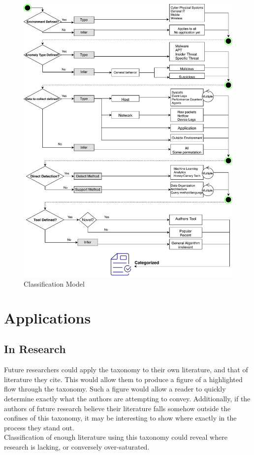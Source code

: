 \documentclass[10pt]{IEEEtran}
\begin{document}
\begin{figure}
  \includegraphics[width=\textwidth]{logicdiagram.pdf}
  \caption{Classification Model}
\end{figure}

\section{Applications}
\subsection{In Research}
Future researchers could apply the taxonomy to their own literature, and that of literature they cite. This would allow them to produce a figure of a highlighted flow through the taxonomy. Such a figure would allow a reader to quickly determine exactly what the authors are attempting to convey. Additionally, if the authors of future research believe their literature falls somehow outside the confines of this taxonomy, it may be interesting to show where exactly in the process they stand out.\\ Classification of enough literature using this taxonomy could reveal where research is lacking, or conversely over-saturated. 
\end{document}
